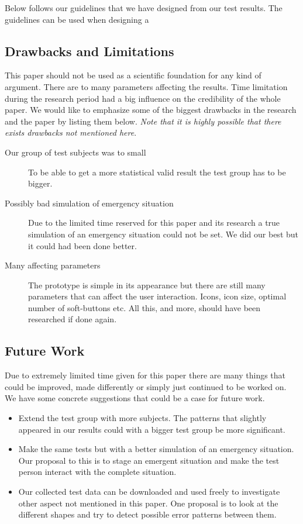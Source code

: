 \documentclass[runningheads,a4paper,oribibl]{llncs}
\begin{document}
Below follows our guidelines that we have designed from our test results. The guidelines can be used when designing a 

\subsection{Drawbacks and Limitations}
This paper should not be used as a scientific foundation for any kind of argument. There are to many parameters affecting the results. Time limitation during the research period had a big influence on the credibility of the whole paper. We would like to emphasize some of the biggest drawbacks in the research and the paper by listing them below. \emph{Note that it is highly possible that there exists drawbacks not mentioned here}.

\begin{description}
	\item[Our group of test subjects was to small] To be able to get a more statistical valid result the test group has to be bigger.
	\item[Possibly bad simulation of emergency situation] Due to the limited time reserved for this paper and its research a true simulation of an emergency situation could not be set. We did our best but it could had been done better.
	\item[Many affecting parameters] The prototype is simple in its appearance but there are still many parameters that can affect the user interaction. Icons, icon size, optimal number of soft-buttons etc. All this, and more, should have been researched if done again. 
\end{description}

\subsection{Future Work}
Due to extremely limited time given for this paper there are many things that could be improved, made differently or simply just continued to be worked on. We have some concrete suggestions that could be a case for future work.

\begin{itemize}
	\item Extend the test group with more subjects. The patterns that slightly appeared in our results could with a bigger test group be more significant.
	\item Make the same tests but with a better simulation of an emergency situation. Our proposal to this is to stage an emergent situation and make the test person interact with the complete situation.
	\item Our collected test data can be downloaded and used freely to investigate other aspect not mentioned in this paper. One proposal is to look at the different shapes and try to detect possible error patterns between them.
\end{itemize}
\end{document}
